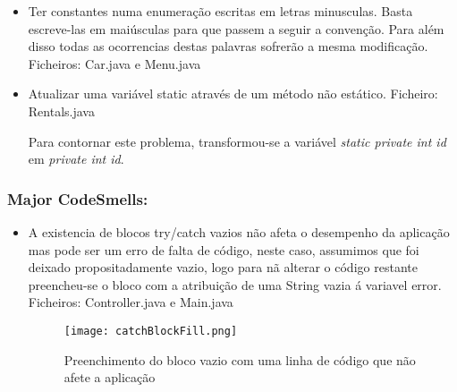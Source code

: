 \begin{itemize}
\item Ter constantes numa enumeração escritas em letras minusculas. Basta escreve-las em maiúsculas para que passem a seguir a convenção. Para além disso todas as ocorrencias destas palavras sofrerão a mesma modificação.
 Ficheiros: Car.java e Menu.java\newline
\end{itemize}

\begin{itemize}
\item Atualizar uma variável static através de um método não estático.\newline
 Ficheiro: Rentals.java\newline
\par Para contornar este problema, transformou-se a variável \textit{static private int id} em \textit{private int id}.
\end{itemize}




\subsubsection{Major CodeSmells:}

\begin{itemize}
\item A existencia de blocos try/catch vazios não afeta o desempenho da aplicação mas pode ser um erro de falta de código, neste caso, assumimos que foi deixado propositadamente vazio, logo para nã alterar o código restante preencheu-se o bloco com a atribuição de uma String vazia á variavel error.\newline
 Ficheiros: Controller.java e Main.java\newline

 \begin{figure}[H]

  \centering

  \texttt{[image: catchBlockFill.png]}

  \caption {Preenchimento do bloco vazio com uma linha de código que não afete a aplicação}

  \label {fig10}

\end{figure}
\end{itemize}

